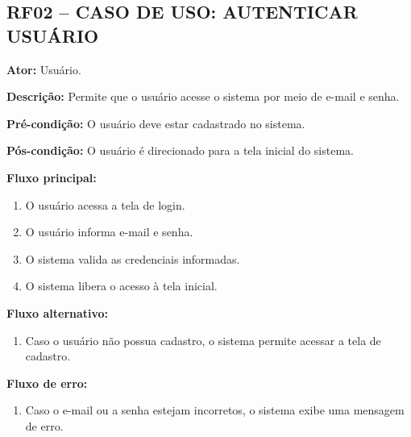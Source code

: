 \documentclass[12pt,oneside,a4paper,brazil,final]{abntex2}
\begin{document}
\clearpage
\subsection*{RF02 -- CASO DE USO: AUTENTICAR USUÁRIO}



\textbf{Ator:} Usuário.



\textbf{Descrição:} Permite que o usuário acesse o sistema por meio de e-mail e senha.



\textbf{Pré-condição:} O usuário deve estar cadastrado no sistema.



\textbf{Pós-condição:} O usuário é direcionado para a tela inicial do sistema.



\textbf{Fluxo principal:}

\begin{enumerate}

    \item O usuário acessa a tela de login.

    \item O usuário informa e-mail e senha.

    \item O sistema valida as credenciais informadas.

    \item O sistema libera o acesso à tela inicial.

\end{enumerate}



\textbf{Fluxo alternativo:}

\begin{enumerate}

    \item Caso o usuário não possua cadastro, o sistema permite acessar a tela de cadastro.

\end{enumerate}



\textbf{Fluxo de erro:}

\begin{enumerate}

    \item Caso o e-mail ou a senha estejam incorretos, o sistema exibe uma mensagem de erro.

\end{enumerate}
\end{document}
